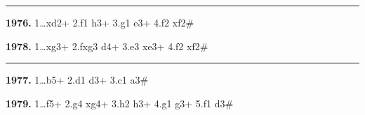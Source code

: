 \documentclass[12pt,twoside]{article}
\begin{document}
\noindent\rule{\textwidth}{0.4pt}

\vspace{0.15em}

\noindent{}

\vspace{0.75em}

{\footnotesize\sloppy
\noindent
\begin{minipage}[t]{\textwidth}
    \begin{minipage}[c]{0.47\textwidth}
{\bfseries 1976.} 1\ldots \symbishop{}xd2+ 2.\symking{}f1 \symqueen{}h3+ 3.\symking{}g1 \symbishop{}e3+ 4.\symbishop{}f2 \symbishop{}xf2\#
        \vspace{0.45em}

{\bfseries 1978.} 1\ldots \symrook{}xg3+ 2.fxg3 \symbishop{}d4+ 3.\symbishop{}e3 \symbishop{}xe3+ 4.\symrook{}f2 \symbishop{}xf2\#    \end{minipage}
        \hfill
    \begin{minipage}[c][4.9\baselineskip][c]{0.02\textwidth}
        \centering\rule{0.4pt}{4.7\baselineskip}
    \end{minipage}
    \hfill
    \begin{minipage}[c]{0.47\textwidth}
{\bfseries 1977.} 1\ldots \symqueen{}b5+ 2.\symking{}d1 \symqueen{}d3+ 3.\symking{}c1 \symbishop{}a3\#
        \vspace{0.45em}

{\bfseries 1979.} 1\ldots \symbishop{}f5+ 2.g4 \symqueen{}xg4+ 3.\symking{}h2 \symqueen{}h3+ 4.\symking{}g1 \symqueen{}g3+ 5.\symking{}f1 \symbishop{}d3\#    \end{minipage}
\end{minipage}
}
\end{document}
